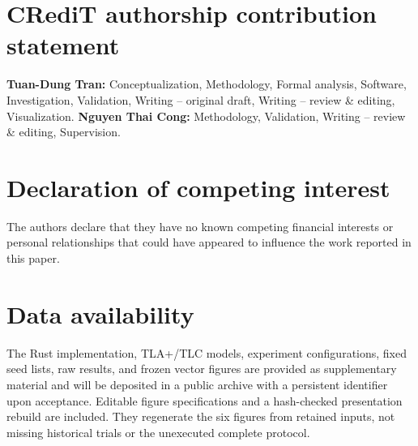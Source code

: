 \documentclass[5p,times,twocolumn]{elsarticle}
\theoremstyle{definition}
\theoremstyle{remark}
\begin{document}









\section*{CRediT authorship contribution statement}
\textbf{Tuan-Dung Tran:} Conceptualization, Methodology, Formal analysis, Software, Investigation,
Validation, Writing -- original draft, Writing -- review \& editing, Visualization.
\textbf{Nguyen Thai Cong:} Methodology, Validation, Writing -- review \& editing, Supervision.

\section*{Declaration of competing interest}
The authors declare that they have no known competing financial interests or personal relationships
that could have appeared to influence the work reported in this paper.

\section*{Data availability}
The Rust implementation, TLA+/TLC models, experiment configurations, fixed seed lists, raw results,
and frozen vector figures are provided as supplementary material and will be deposited in a public
archive with a persistent identifier upon acceptance. Editable figure specifications and a
hash-checked presentation rebuild are included. They regenerate the six figures from retained
inputs, not missing historical trials or the unexecuted complete protocol.




\appendix

\end{document}
